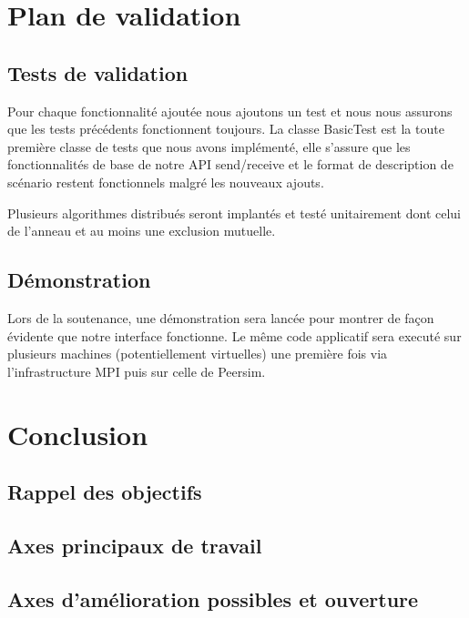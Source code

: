\documentclass{article}
\begin{document}
		\section{Plan de validation}
		\subsection{Tests de validation}
		Pour chaque fonctionnalité ajoutée nous ajoutons un test et nous nous assurons que les tests précédents fonctionnent toujours.
		\newline
		La classe BasicTest est la toute première classe de tests que nous avons implémenté, elle s'assure que les fonctionnalités de base de notre API
		send/receive et le format de description de scénario restent fonctionnels malgré les nouveaux ajouts.

		Plusieurs algorithmes distribués seront implantés et testé unitairement dont celui de l'anneau et au moins une exclusion mutuelle.
		\subsection{Démonstration}
		Lors de la soutenance, une démonstration sera lancée pour montrer de façon évidente que notre interface fonctionne.
		Le même code applicatif sera executé sur plusieurs machines (potentiellement virtuelles) une première fois via l'infrastructure MPI puis sur celle de Peersim.
		
		\newpage
		\section{Conclusion}
		\subsection{Rappel des objectifs}
		\subsection{Axes principaux de travail}
		\subsection{Axes d'amélioration possibles et ouverture}
		
		
\end{document}
